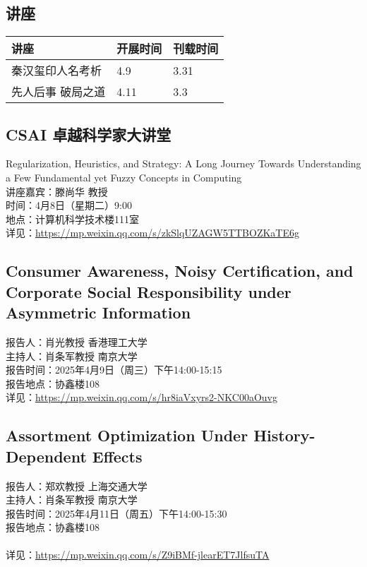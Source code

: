 \documentclass[letterpaper, 12pt]{article}
\begin{document}
\begin{multicols}{2}
\pagebreak

\section{讲座}
\begin{tabular}{|>{\centering\arraybackslash}m{}|m{}|m{}|}
    \hline
    讲座 & 开展时间 & 刊载时间\\
    \hline\hline
    秦汉玺印人名考析 & 4.9 & 3.31\\\hline
    先人后事 破局之道 & 4.11 & 3.3\\\hline
\end{tabular}
\subsection{CSAI 卓越科学家大讲堂 }
Regularization, Heuristics, and Strategy: A Long Journey Towards Understanding a Few Fundamental yet Fuzzy Concepts in Computing
\\讲座嘉宾：滕尚华 教授
\\时间：4月8日（星期二）9:00
\\地点：计算机科学技术楼111室
\\详见：\url{https://mp.weixin.qq.com/s/zkSlqUZAGW5TTBOZKaTE6g}

\subsection{Consumer Awareness, Noisy Certification, and Corporate Social Responsibility under Asymmetric Information}
报告人：肖光教授 香港理工大学
\\主持人：肖条军教授 南京大学
\\报告时间：2025年4月9日（周三）下午14:00-15:15
\\报告地点：协鑫楼108
\\详见：\url{https://mp.weixin.qq.com/s/hr8iaVxyrs2-NKC00aOuvg}


\subsection{Assortment Optimization Under History-Dependent Effects}
报告人：郑欢教授 上海交通大学
\\主持人：肖条军教授 南京大学
\\报告时间：2025年4月11日（周五）下午14:00-15:30
\\报告地点：协鑫楼108
\\
\\详见：\url{https://mp.weixin.qq.com/s/Z9iBMf-jlearET7JlfsuTA}



\end{multicols}
\end{document}
